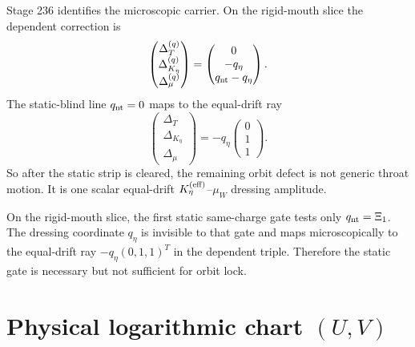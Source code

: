 Stage 236 identifies the microscopic carrier.  On the rigid-mouth slice the dependent correction is
\begin{equation}
\label{eq:part07-dependent-correction-q}
\begin{pmatrix}\Delta_T^{(q)}\\\Delta_{K_\eta}^{(q)}\\\Delta_\mu^{(q)}\end{pmatrix}
=
\begin{pmatrix}0\\-q_\eta\\q_{\rm nt}-q_\eta\end{pmatrix}.
\end{equation}
The static-blind line \(q_{\rm nt}=0\) maps to the equal-drift ray
\begin{equation}
\label{eq:part07-equal-drift-ray}
\begin{pmatrix}\Delta_T\\\Delta_{K_\eta}\\\Delta_\mu\end{pmatrix}
=
-q_\eta\begin{pmatrix}0\\1\\1\end{pmatrix}.
\end{equation}
So after the static strip is cleared, the remaining orbit defect is not generic throat motion.  It is one scalar equal-drift \(K_\eta^{(\rm eff)}\)--\(\mu_W\) dressing amplitude.

\begin{theorem}
\label{thm:part07-rigid-mouth-packet}
On the rigid-mouth slice, the first static same-charge gate tests only \(q_{\rm nt}=\Xi_1\).  The dressing coordinate \(q_\eta\) is invisible to that gate and maps microscopically to the equal-drift ray \(-q_\eta(0,1,1)^T\) in the dependent triple.  Therefore the static gate is necessary but not sufficient for orbit lock.
\end{theorem}


\section{Physical logarithmic chart \texorpdfstring{\((U,V)\)}{(U,V)}}
\label{sec:part07_same_charge_rigid_mouth:physical-logarithmic-chart-u-v}

